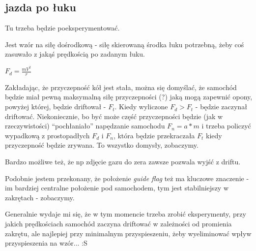 \documentclass[12pt]{article}
\begin{document}
\subsection{jazda po łuku}
Tu trzeba będzie poeksperymentować. 

Jest wzór na siłę dośrodkową - siłę skierowaną środka łuku potrzebną, żeby coś zasuwało z jakąś prędkością po zadanym łuku. 

$F_d = \frac{mV^2}{r}$

Zakładając, że przyczepność kół jest stała, można się domyślać, że samochód będzie miał pewną maksymalną siłę przyczepności (?) jaką mogą zapewnić opony, powyżej której, będzie driftował - $F_t$. Kiedy wyliczone $F_d > F_t$ - będzie zaczynał driftować. Niekoniecznie, bo być może część przyczepności będzie (jak w rzeczywistości) ``pochłaniało'' napędzanie samochodu $F_n = a * m$ i trzeba policzyć wypadkową z prostopadłych $F_d$ i $F_n$, która będzie przekraczała $F_t$ kiedy przyczepność będzie zrywana. To wszystko domysły, zobaczymy.

Bardzo możliwe też, że np zdjęcie gazu do zera zawsze pozwala wyjść z driftu.

Podobnie jestem przekonany, że położenie \textit{guide flag} też ma kluczowe znaczenie - im bardziej centralne położenie pod samochodem, tym jest stabilniejszy w zakrętach - zobaczymy.

Generalnie wydaje mi się, że w tym momencie trzeba zrobić eksperymenty, przy jakich prędkościach samochód zaczyna driftować w zależności od promienia zakrętu, ale najlepiej przy minimalnym przyspieszeniu, żeby wyeliminować wpływ przyspieszenia na wzór... :S
\end{document}
